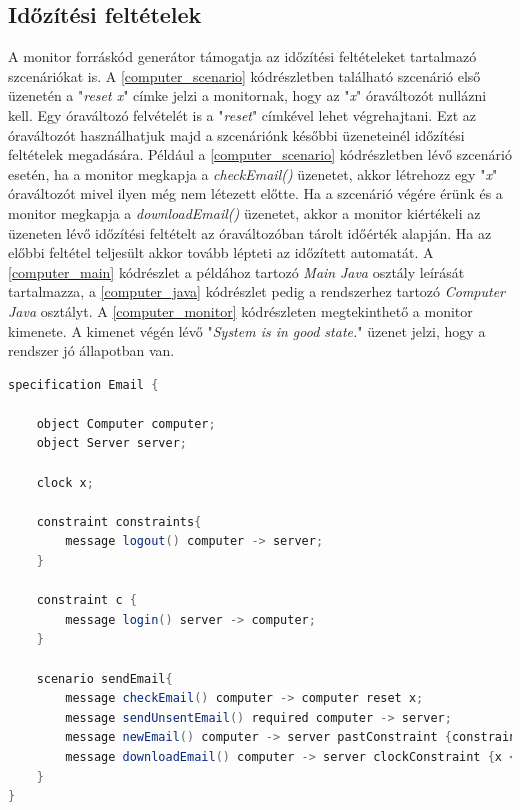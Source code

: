 \subsection{Időzítési feltételek}

A monitor forráskód generátor támogatja az időzítési feltételeket tartalmazó szcenáriókat is.
A \ref{computer_scenario} kódrészletben található szcenárió első üzenetén a "\textit{reset x}" címke jelzi a monitornak, hogy az "\textit{x}" óraváltozót nullázni kell.
Egy óraváltozó felvételét is a "\textit{reset}" címkével lehet végrehajtani.
Ezt az óraváltozót használhatjuk majd a szcenáriónk későbbi üzeneteinél időzítési feltételek megadására.
Például a \ref{computer_scenario} kódrészletben lévő szcenárió esetén, ha a monitor megkapja a \textit{checkEmail()} üzenetet, akkor létrehozz egy "\textit{x}" óraváltozót mivel ilyen még nem létezett előtte.
Ha a szcenárió végére érünk és a monitor megkapja a \textit{downloadEmail()} üzenetet, akkor a monitor kiértékeli az üzeneten lévő időzítési feltételt az óraváltozóban tárolt időérték alapján.
Ha az előbbi feltétel teljesült akkor tovább lépteti az időzített automatát.
A \ref{computer_main} kódrészlet a példához tartozó \textit{Main} \textit{Java} osztály leírását tartalmazza, a \ref{computer_java} kódrészlet pedig a rendszerhez tartozó \textit{Computer} \textit{Java} osztályt.
A \ref{computer_monitor} kódrészleten megtekinthető a monitor kimenete.
A kimenet végén lévő "\textit{System is in good state.}" üzenet jelzi, hogy a rendszer jó állapotban van.

\begin{lstlisting}[language=java, frame=single, float=ht!, caption={Időzítési feltételeket tartalmazó szcenárió},captionpos=b,label=computer_scenario]
specification Email {

	object Computer computer;
	object Server server;

	clock x;

	constraint constraints{
		message logout() computer -> server;
	}

	constraint c {
		message login() server -> computer;
	}

	scenario sendEmail{
		message checkEmail() computer -> computer reset x;
		message sendUnsentEmail() required computer -> server;
		message newEmail() computer -> server pastConstraint {constraints};
		message downloadEmail() computer -> server clockConstraint {x < 10};
	}
}
\end{lstlisting}

